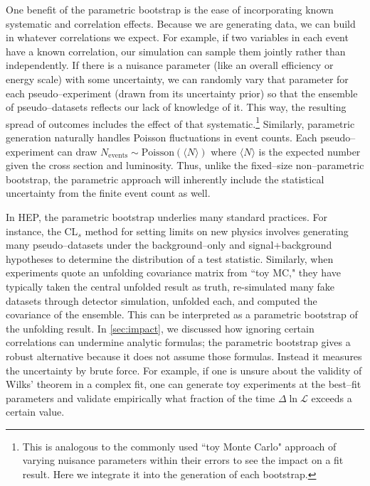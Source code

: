             One benefit of the parametric bootstrap is the ease of incorporating known systematic and correlation effects.
            Because we are generating data, we can build in whatever correlations we expect.
            For example, if two variables in each event have a known correlation, our simulation can sample them jointly rather than independently.
            If there is a nuisance parameter (like an overall efficiency or energy scale) with some uncertainty, we can randomly vary that parameter for each pseudo--experiment (drawn from its uncertainty prior) so that the ensemble of pseudo--datasets reflects our lack of knowledge of it.
            This way, the resulting spread of outcomes includes the effect of that systematic.\footnote{
                This is analogous to the commonly used ``toy Monte Carlo" approach of varying nuisance parameters within their errors to see the impact on a fit result.
                Here we integrate it into the generation of each bootstrap.
            }
            Similarly, parametric generation naturally handles Poisson fluctuations in event counts.
            Each pseudo--experiment can draw $N_{\text{events}} \sim \text{Poisson}(\langle N \rangle)$ where $\langle N \rangle$ is the expected number given the cross section and luminosity.
            Thus, unlike the fixed--size non--parametric bootstrap, the parametric approach will inherently include the statistical uncertainty from the finite event count as well.

            In HEP, the parametric bootstrap underlies many standard practices.
            For instance, the CL$_s$ method for setting limits on new physics involves generating many pseudo--datasets under the background--only and signal+background hypotheses to determine the distribution of a test statistic.
            Similarly, when experiments quote an unfolding covariance matrix from ``toy MC," they have typically taken the central unfolded result as truth, re-simulated many fake datasets through detector simulation, unfolded each, and computed the covariance of the ensemble.
            This can be interpreted as a parametric bootstrap of the unfolding result.
            In \cref{sec:impact}, we discussed how ignoring certain correlations can undermine analytic formulas;
            the parametric bootstrap gives a robust alternative because it does not assume those formulas.
            Instead it measures the uncertainty by brute force.
            For example, if one is unsure about the validity of Wilks’ theorem in a complex fit, one can generate toy experiments at the best--fit parameters and validate empirically what fraction of the time $\Delta\ln\mathcal{L}$ exceeds a certain value.

